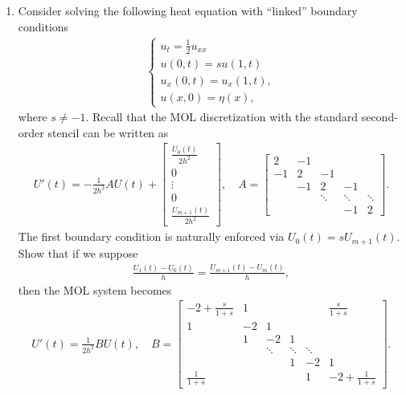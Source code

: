 \documentclass[10pt]{amsart}
\begin{document}
  \begin{enumerate}[label={\bf Problem~{\arabic*}:}]

    \item Consider solving the following heat equation with ``linked'' boundary conditions
  \begin{align*}
\begin{cases}
u_t = \frac 1 2 u_{xx}\\
u(0,t) = s u(1,t)\\
u_x(0,t) = u_x(1,t),\\
u(x,0) = \eta(x),
\end{cases}
\end{align*}
where $s \neq -1$.   Recall that the MOL discretization with the standard second-order stencil can be written as
\begin{align*}
U'(t) = -\frac{1}{2h^2} A U(t) + \begin{bmatrix} \frac{U_0(t)}{2h^2} \\ 0 \\ \vdots \\ 0 \\ \frac{U_{m+1}(t)}{2h^2} \end{bmatrix}, \quad A = \begin{bmatrix}
2  & -1\\
-1 & 2 & -1 \\
& -1 & 2 & -1\\
&& \ddots & \ddots & \ddots \\
&&& -1 & 2 \end{bmatrix}.
\end{align*}
The first boundary condition is naturally enforced via $U_0(t) = s U_{m+1}(t)$. Show that if we suppose
\begin{align*}
\frac{U_{1}(t) - U_0(t)}{h} = \frac{U_{m+1}(t) - U_m(t)}{h},
\end{align*}
then the MOL system becomes
\begin{align}\label{mol}
U'(t) = \frac{1}{2h^2} B U(t), \quad B = \begin{bmatrix}
-2 + \frac{s}{1 + s} & 1 &&&& \frac{s}{1 + s}\\
1 & -2 & 1 \\
& 1 & -2 & 1 & \\
&&\ddots & \ddots & \ddots \\
&&&1 & -2 & 1 \\
\frac{1}{1+s} &&&& 1 & -2 + \frac{1}{1+s} \end{bmatrix}.
\end{align}


\end{enumerate}
\end{document}
